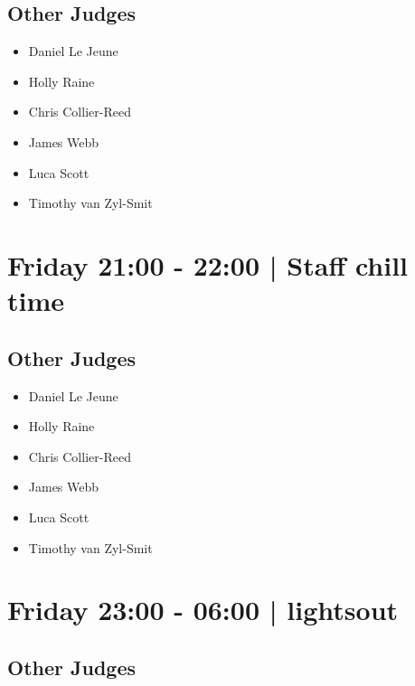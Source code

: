 \documentclass[10pt, A5]{article}
\begin{document}
        \subsection*{Other Judges}
        
            \begin{itemize}
                            \item Daniel Le Jeune
                            \item Holly Raine
                            \item Chris Collier-Reed
                            \item James Webb
                            \item Luca Scott
                            \item Timothy van Zyl-Smit
                        \end{itemize}
        

            \section*{Friday 21:00
        -
        22:00
        |
         Staff chill time}
        
                
        \subsection*{Other Judges}
        
            \begin{itemize}
                            \item Daniel Le Jeune
                            \item Holly Raine
                            \item Chris Collier-Reed
                            \item James Webb
                            \item Luca Scott
                            \item Timothy van Zyl-Smit
                        \end{itemize}
        

            \section*{Friday 23:00
        -
        06:00
        |
         lightsout}
        
                
        \subsection*{Other Judges}
        
\end{document}
